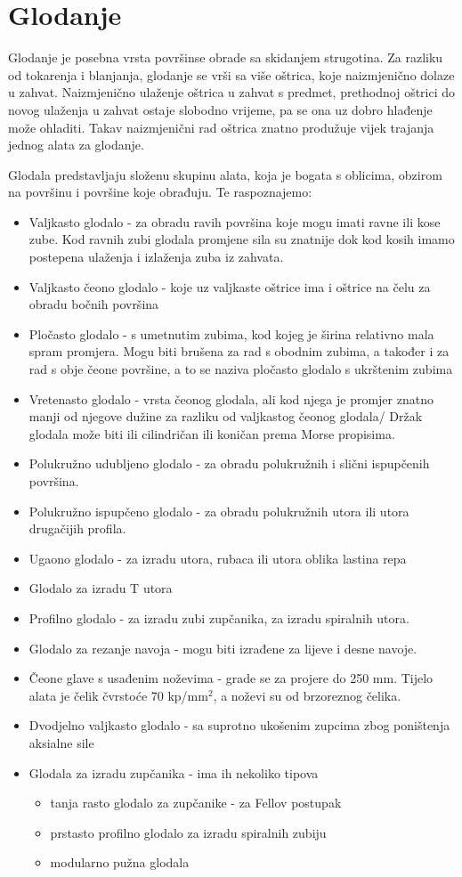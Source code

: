 \documentclass[a4paper,12pt]{article}
\numberwithin{figure}{section}
\begin{document}
\section{Glodanje}
Glodanje je posebna vrsta površinse obrade sa skidanjem strugotina. Za razliku od tokarenja i blanjanja, glodanje se vrši sa više oštrica, koje naizmjenično dolaze u zahvat. Naizmjenično ulaženje oštrica u zahvat s predmet, prethodnoj oštrici do novog ulaženja u zahvat ostaje slobodno vrijeme, pa se ona uz dobro hlađenje može ohladiti. Takav naizmjenični rad oštrica znatno produžuje vijek trajanja jednog alata za glodanje.\par
Glodala predstavljaju složenu skupinu alata, koja je bogata s oblicima, obzirom na površinu i površine koje obrađuju. Te raspoznajemo:
\begin{itemize}
\item Valjkasto glodalo - za obradu ravih površina koje mogu imati ravne ili kose zube. Kod ravnih zubi glodala promjene sila su znatnije dok kod kosih imamo postepena ulaženja i izlaženja zuba iz zahvata.
\item Valjkasto čeono glodalo - koje uz valjkaste oštrice ima i oštrice na čelu za obradu bočnih površina
\item Pločasto glodalo - s umetnutim zubima, kod kojeg je širina relativno mala spram promjera. Mogu biti brušena za rad s obodnim zubima, a također i za rad s obje čeone površine, a to se naziva pločasto glodalo s ukrštenim zubima
\item Vretenasto glodalo - vrsta čeonog glodala, ali kod njega je promjer znatno manji od njegove dužine za razliku od valjkastog čeonog glodala/ Držak glodala može biti ili cilindričan ili koničan prema Morse propisima.
\item Polukružno udubljeno glodalo - za obradu polukružnih i slični ispupčenih površina.
\item Polukružno ispupčeno glodalo - za obradu polukružnih utora ili utora drugačijih profila.
\item Ugaono glodalo - za izradu utora, rubaca ili utora oblika lastina repa
\item Glodalo za izradu T utora
\item Profilno glodalo - za izradu zubi zupčanika, za izradu spiralnih utora.
\item Glodalo za rezanje navoja - mogu biti izrađene za lijeve i desne navoje.
\item Čeone glave s usađenim noževima - grade se za projere do 250 mm. Tijelo alata je čelik čvrstoće 70 kp/mm$^{2}$, a noževi su od brzoreznog čelika.
\item Dvodjelno valjkasto glodalo - sa suprotno ukošenim zupcima zbog poništenja aksialne sile
\item  Glodala za izradu zupčanika - ima ih nekoliko tipova 
\begin{itemize}
\item tanja rasto glodalo za zupčanike - za Fellov postupak
\item prstasto profilno glodalo za izradu spiralnih zubiju
\item modularno pužna glodala
\end{itemize}
\end{itemize}
\end{document}
